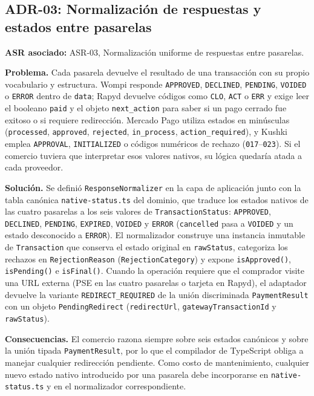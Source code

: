 \subsection{ADR-03: Normalización de respuestas y estados entre pasarelas}
\textbf{ASR asociado:} ASR-03, Normalización uniforme de respuestas entre pasarelas.

\textbf{Problema.} Cada pasarela devuelve el resultado de una transacción con su propio vocabulario y estructura. Wompi responde \texttt{APPROVED}, \texttt{DECLINED}, \texttt{PENDING}, \texttt{VOIDED} o \texttt{ERROR} dentro de \texttt{data}; Rapyd devuelve códigos como \texttt{CLO}, \texttt{ACT} o \texttt{ERR} y exige leer el booleano \texttt{paid} y el objeto \texttt{next\_action} para saber si un pago cerrado fue exitoso o si requiere redirección. Mercado Pago utiliza estados en minúsculas (\texttt{processed}, \texttt{approved}, \texttt{rejected}, \texttt{in\_process}, \texttt{action\_required}), y Kushki emplea \texttt{APPROVAL}, \texttt{INITIALIZED} o códigos numéricos de rechazo (\texttt{017}--\texttt{023}). Si el comercio tuviera que interpretar esos valores nativos, su lógica quedaría atada a cada proveedor.

\textbf{Solución.} Se definió \texttt{ResponseNormalizer} en la capa de aplicación junto con la tabla canónica \texttt{native-status.ts} del dominio, que traduce los estados nativos de las cuatro pasarelas a los seis valores de \texttt{TransactionStatus}: \texttt{APPROVED}, \texttt{DECLINED}, \texttt{PENDING}, \texttt{EXPIRED}, \texttt{VOIDED} y \texttt{ERROR} (\texttt{cancelled} pasa a \texttt{VOIDED} y un estado desconocido a \texttt{ERROR}). El normalizador construye una instancia inmutable de \texttt{Transaction} que conserva el estado original en \texttt{rawStatus}, categoriza los rechazos en \texttt{RejectionReason} (\texttt{RejectionCategory}) y expone \texttt{isApproved()}, \texttt{isPending()} e \texttt{isFinal()}. Cuando la operación requiere que el comprador visite una URL externa (PSE en las cuatro pasarelas o tarjeta en Rapyd), el adaptador devuelve la variante \texttt{REDIRECT\_REQUIRED} de la unión discriminada \texttt{PaymentResult} con un objeto \texttt{PendingRedirect} (\texttt{redirectUrl}, \texttt{gatewayTransactionId} y \texttt{rawStatus}).

\textbf{Consecuencias.} El comercio razona siempre sobre seis estados canónicos y sobre la unión tipada \texttt{PaymentResult}, por lo que el compilador de TypeScript obliga a manejar cualquier redirección pendiente. Como costo de mantenimiento, cualquier nuevo estado nativo introducido por una pasarela debe incorporarse en \texttt{native-status.ts} y en el normalizador correspondiente.

